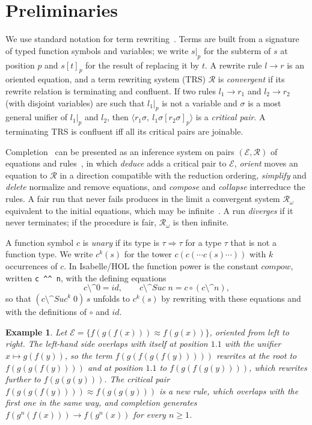 \documentclass[preprint,12pt]{elsarticle}
\newtheorem{example}{Example}
\newcommand{\R}{\mathcal{R}}
\newcommand{\E}{\mathcal{E}}
\newcommand{\rw}{\to}
\newcommand{\pw}[2]{#1^{#2}}               %
\newcommand{\pp}{\mathbin{\texttt{\^{}\^{}}}}     %
\newcommand{\fp}[2]{(#1 \pp #2)}                  %
\newcommand{\isa}[1]{\texttt{#1}}
\newcommand{\Suc}{\mathit{Suc}}
\begin{document}
\section{Preliminaries}
\label{sec:prelim}

We use standard notation for term rewriting~\cite{BaaderNipkow98}. Terms
are built from a signature of typed function symbols and variables; we
write $s|_p$ for the subterm of $s$ at position $p$ and $s[t]_p$ for the
result of replacing it by $t$. A rewrite rule $l \rw r$ is an oriented
equation, and a term rewriting system (TRS) $\R$ is \emph{convergent} if
its rewrite relation is terminating and confluent. If two rules
$l_1 \rw r_1$ and $l_2 \rw r_2$ (with disjoint variables) are such that
$l_1|_p$ is not a variable and $\sigma$ is a most general unifier of
$l_1|_p$ and $l_2$, then
$\langle r_1\sigma,\ l_1\sigma[r_2\sigma]_p\rangle$ is a \emph{critical
pair}. A terminating TRS is confluent iff all its critical pairs are
joinable.

Completion~\cite{KnuthBendix70,BachmairDershowitzPlaisted89} can be
presented as an inference system on pairs $(\E,\R)$ of equations and
rules~\cite{BaaderNipkow98}, in which \emph{deduce} adds a critical pair to $\E$,
\emph{orient} moves an equation to $\R$ in a direction compatible with the
reduction ordering, \emph{simplify} and \emph{delete} normalize and remove
equations, and \emph{compose} and \emph{collapse} interreduce the rules. A
fair run that never fails produces in the limit a convergent system
$\R_\omega$ equivalent to the initial equations, which may be
infinite~\cite{HirokawaMiddeldorpSternagelWinkler17}. A run
\emph{diverges} if it never terminates; if the procedure is fair,
$\R_\omega$ is then infinite.

A function symbol $c$ is \emph{unary} if its type is
$\tau \Rightarrow \tau$ for a type $\tau$ that is not a function type. We
write $\pw{c}{k}(s)$ for the tower $c(c(\cdots c(s)\cdots))$ with $k$
occurrences of $c$. In Isabelle/HOL the function power is the constant
$\mathit{compow}$, written \isa{c \^{}\^{} n}, with the defining equations
\[
  c \pp 0 = \mathit{id}, \qquad
  c \pp \Suc\;n = c \circ (c \pp n),
\]
so that $\fp{c}{\Suc^k\;0}\,s$ unfolds to $\pw{c}{k}(s)$ by rewriting with
these equations and with the definitions of $\circ$ and $\mathit{id}$.

\begin{example}\label{ex:fg}
Let $\E = \{ f(g(f(x))) \approx f(g(x)) \}$, oriented from left to right.
The left-hand side overlaps with itself at position $1.1$ with the unifier
$x \mapsto g(f(y))$, so the term $f(g(f(g(f(y)))))$ rewrites at the root to
$f(g(g(f(y))))$ and at position $1.1$ to $f(g(f(g(y))))$, which rewrites
further to $f(g(g(y)))$. The critical pair
$f(g(g(f(y)))) \approx f(g(g(y)))$ is a new rule, which overlaps with the
first one in the same way, and completion generates
$f(\pw{g}{n}(f(x))) \rw f(\pw{g}{n}(x))$ for every $n \ge 1$.
\end{example}
\end{document}
